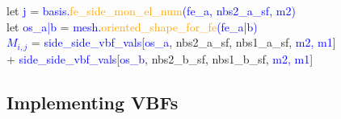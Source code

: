 \documentclass[compress]{beamer}
\begin{document}
\begin{frame}
{    \hspace{0.3cm}let \textcolor{blue}{j} = 
      \textcolor{blue}{basis.\textcolor{orange}{fe\_side\_mon\_el\_num}(\textcolor{green!50!black}{\small fe\_a, nbs2\_a\_sf}, {\small m2})}\\
    \hspace{0.3cm}let \textcolor{blue}{os\_a|b} = 
      \textcolor{blue}{mesh.\textcolor{orange}{oriented\_shape\_for\_fe}(\textcolor{green!50!black}{fe\_a|b})}\\
    \hspace{0.3cm}\textcolor{blue}{$M_{i,j}$} = 
      {\small \textcolor{blue}{side\_side\_vbf\_vals}[\textcolor{blue}{os\_a}, \textcolor{green!50!black}{nbs2\_a\_sf, nbs1\_a\_sf},
      \textcolor{blue}{m2, m1}]}\\
    \hspace{1.134cm}+
      {\small \textcolor{blue}{side\_side\_vbf\_vals}[\textcolor{blue}{os\_b}, \textcolor{green!50!black}{nbs2\_b\_sf, nbs1\_b\_sf},
      \textcolor{blue}{m2, m1}]}
  } 
\end{frame}


\subsection{Implementing VBFs}
\end{document}
